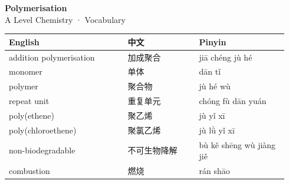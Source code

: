\documentclass[11pt]{article}
\begin{document}
\begin{center}
  {\LARGE\bfseries Polymerisation}\\[0.35em]
  {\large A Level Chemistry · Vocabulary}
\end{center}
\vspace{0.6em}

\begin{longtable}{@{}p{0.40\linewidth}p{0.24\linewidth}p{0.30\linewidth}@{}}
\toprule
\textbf{English} & \textbf{中文} & \textbf{Pinyin} \\
\midrule
\endhead
\bottomrule
\endlastfoot
addition polymerisation & 加成聚合 & jiā chéng jù hé \\
monomer & 单体 & dān tǐ \\
polymer & 聚合物 & jù hé wù \\
repeat unit & 重复单元 & chóng fù dān yuán \\
poly(ethene) & 聚乙烯 & jù yǐ xī \\
poly(chloroethene) & 聚氯乙烯 & jù lǜ yǐ xī \\
non-biodegradable & 不可生物降解 & bù kě shēng wù jiàng jiě \\
combustion & 燃烧 & rán shāo \\
\end{longtable}
\end{document}
